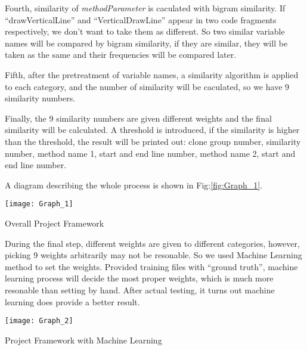 \documentclass[../main.tex]{subfiles}
\begin{document}
Fourth, similarity of \textit{methodParameter} is caculated with bigram similarity. If ``drawVerticalLine'' and ``VerticalDrawLine'' appear in two code fragments respectively, we don't want to take them as different. So two similar variable names will be compared by bigram similarity, if they are similar, they will be taken as the same and their frequencies will be compared later.

Fifth, after the pretreatment of variable names, a similarity algorithm is applied to each category, and the number of similarity will be caculated, so we have 9 similarity numbers.

Finally, the 9 similarity numbers are given different weights and the final similarity will be calculated. A threshold is introduced, if the similarity is higher than the threshold, the result will be printed out: clone group number, similarity number, method name 1, start and end line number, method name 2, start and end line number.

A diagram describing the whole process is shown in Fig:\ref{fig:Graph_1}.\\

\begin{figurehere}
\centering \texttt{[image: Graph\_1]} 
\caption{Overall Project Framework} \label{fig:Graph_1}
\end{figurehere}

During the final step, different weights are given to different categories, however, picking 9 weights arbitrarily may not be resonable. So we used Machine Learning method to set the weights. Provided training files with ``ground truth'', machine learning process will decide the most proper weights, which is much more resonable than setting by hand. After actual testing, it turns out machine learning does provide a better result.\\

\begin{figurehere}
\centering \texttt{[image: Graph\_2]} 
\caption{Project Framework with Machine Learning} \label{fig:Graph_2}
\end{figurehere}
\end{document}
